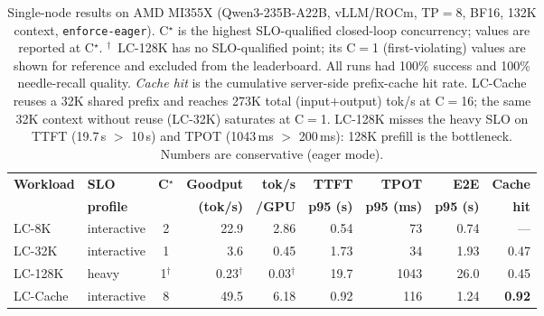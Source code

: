 
\begin{table}[t]
  \centering
  \small
  \begin{tabular}{@{}l l c r r r r r r@{}}
    \toprule
    \textbf{Workload} & \textbf{SLO} & \textbf{C$^\star$} &
    \textbf{Goodput} & \textbf{tok/s} & \textbf{TTFT} & \textbf{TPOT} &
    \textbf{E2E} & \textbf{Cache} \\
     & \textbf{profile} & & \textbf{(tok/s)} & \textbf{/GPU} &
    \textbf{p95 (s)} & \textbf{p95 (ms)} & \textbf{p95 (s)} & \textbf{hit} \\
    \midrule
    LC-8K    & interactive & 2 & 22.9 & 2.86 & 0.54 & 73 & 0.74 & --- \\
    LC-32K   & interactive & 1 & 3.6  & 0.45 & 1.73 & 34 & 1.93 & 0.47 \\
    LC-128K  & heavy       & 1$^\dagger$ & 0.23$^\dagger$ & 0.03$^\dagger$ & 19.7 & 1043 & 26.0 & 0.45 \\
    LC-Cache & interactive & 8 & 49.5 & 6.18 & 0.92 & 116 & 1.24 & \textbf{0.92} \\
    \bottomrule
  \end{tabular}
  \caption{Single-node results on AMD MI355X (Qwen3-235B-A22B, vLLM/ROCm,
  TP$=$8, BF16, 132K context, \texttt{enforce-eager}). C$^\star$ is the highest
  SLO-qualified closed-loop concurrency; values are reported at C$^\star$.
  $^\dagger$~LC-128K has no SLO-qualified point; its C$=$1 (first-violating)
  values are shown for reference and excluded from the leaderboard. All runs had
  100\% success and 100\% needle-recall quality. \emph{Cache hit} is the
  cumulative server-side prefix-cache hit rate. LC-Cache reuses a 32K shared
  prefix and reaches 273K total (input$+$output) tok/s at C$=$16; the same 32K
  context without reuse (LC-32K) saturates at C$=$1. LC-128K misses the heavy
  SLO on TTFT (19.7\,s $>$ 10\,s) and TPOT (1043\,ms $>$ 200\,ms): 128K prefill
  is the bottleneck. Numbers are conservative (eager mode).}
  \label{tab:results-mi355x}
\end{table}

